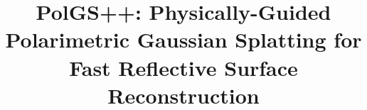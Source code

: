 \newcommand{\Tref}[1]{Table~\ref{#1}}
\newcommand{\Eref}[1]{Equation~(\ref{#1})}
\newcommand{\Fref}[1]{Figure~\ref{#1}}
\newcommand{\Sref}[1]{Section~\ref{#1}}
\newcommand{\Aref}[1]{Algorithm~\ref{#1}}
\newcommand{\tref}[1]{Tab.~(\ref{#1})}
\newcommand{\eref}[1]{Eq.~(\ref{#1})}
\newcommand{\fref}[1]{Fig.~\ref{#1}}
\newcommand{\sref}[1]{Sec.~\ref{#1}}
\newcommand{\aref}[1]{Algo.~\ref{#1}}
\makeatletter
{}
\makeatother
\newcommand{\argmax}{\operatornamewithlimits{argmax}}
\newcommand{\argmin}{\operatornamewithlimits{argmin}}
\newcommand{\bn}{\mathbf{n}}
\newcommand{\bh}{\mathbf{h}}
\newcommand{\bN}{\mathbf{N}}
\newcommand{\bl}{\mathbf{l}}
\newcommand{\bL}{\mathbf{L}}
\newcommand{\bv}{\mathbf{v}}
\newcommand{\bi}{\mathbf{i}}
\newcommand{\br}{\mathbf{r}}
\newcommand{\bI}{\mathbf{I}}
\newcommand{\bA}{\mathbf{A}}
\newcommand{\bB}{\mathbf{B}}
\newcommand{\bD}{\mathbf{D}}
\newcommand{\bS}{\mathbf{S}}
\newcommand{\bs}{\mathbf{s}}
\newcommand{\bH}{\mathbf{H}}
\newcommand{\bZ}{\mathbf{Z}}
\newcommand{\bF}{\mathbf{F}}
\newcommand{\bM}{\mathbf{M}}
\newcommand{\bU}{\mathbf{U}}
\newcommand{\bV}{\mathbf{V}}
\newcommand{\bR}{\mathbf{R}}
\newcommand{\bQ}{\mathbf{Q}}
\newcommand{\bg}{\mathbf{g}}

\newcommand{\rank}{\mathrm{rank}}
\renewcommand{\vec}{\mathrm{vec}}
\def\Vec#1{\mbox{\boldmath $#1$}}

\makeatletter
\DeclareRobustCommand\onedot{\futurelet\@let@token\@onedot}
\def\@onedot{\ifx\@let@token.\else.\null\fi\xspace}
\def\eg{\emph{e.g}\onedot} \def\Eg{\emph{E.g}\onedot}
\def\ie{\emph{i.e}\onedot} \def\Ie{\emph{I.e}\onedot}
\def\cf{\emph{c.f}\onedot} \def\Cf{\emph{C.f}\onedot}
\def\etc{\emph{etc}\onedot} \def\vs{\emph{vs}\onedot}
\def\wrt{w.r.t\onedot} \def\dof{d.o.f\onedot}
\def\etal{\emph{et al}\onedot}
\makeatother
%
%
%
%
%

\sloppy
\title{PolGS++: Physically-Guided Polarimetric Gaussian Splatting for Fast Reflective Surface Reconstruction}

